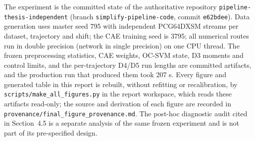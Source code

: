 The experiment is the committed state of the authoritative repository
\texttt{pipeline-thesis-independent} (branch \texttt{simplify-pipeline-code}, commit
\texttt{e62bdee}). Data generation uses master seed 795 with independent PCG64DXSM streams per
dataset, trajectory and shift; the CAE training seed is 3795; all numerical routes run in
double precision (network in single precision) on one CPU thread. The frozen preprocessing
statistics, CAE weights, OC-SVM state, D3 moments and control limits, and the per-trajectory
D4/D5 run lengths are committed artifacts, and the production run that produced them took 207 s.
Every figure and generated table in this report is rebuilt, without refitting or recalibration,
by \texttt{scripts/make\_all\_figures.py} in the report workspace, which reads these artifacts
read-only; the source and derivation of each figure are recorded in
\texttt{provenance/final\_figure\_provenance.md}. The post-hoc diagnostic audit cited in
Section~4.5 is a separate analysis of the same frozen experiment and is not part of its
pre-specified design.
